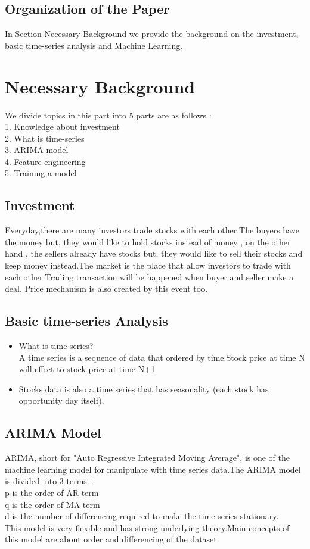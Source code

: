 \documentclass{article}
\begin{document}
\subsection{Organization of the Paper}

In Section Necessary Background we provide the background on the investment, basic time-series analysis and Machine Learning.



\section{Necessary Background}
\label{sec:background}


We divide topics in this part into 5 parts are as follows :\\
1. Knowledge about investment\\
2. What is time-series\\
3. ARIMA model\\
4. Feature engineering\\
5. Training a model


\subsection{Investment}
Everyday,there are many investors trade stocks with each other.The buyers have the money but, they would like to hold stocks instead of money , on the other hand , the sellers already have stocks but, they would like to sell their stocks and keep money instead.The market is the place that allow investors to trade with each other.Trading transaction will be happened when buyer and seller make a deal.
Price mechanism is also created by this event too.

\subsection{Basic time-series Analysis}
\begin{itemize}
\item What is time-series?\\A time series is a sequence of data that ordered by time.Stock price at time N will 
effect to stock price at time N+1
\item Stocks data is also a time series that has seasonality (each stock has opportunity day itself).
\end{itemize}


\subsection{ARIMA Model}
ARIMA, short for "Auto Regressive Integrated Moving Average", is one of the machine learning model for manipulate with time series data.The ARIMA model is divided into 3 terms :\\p is the order of AR term\\q is the order of MA term\\d is the number of differencing required to make the time series stationary.\\This model is very flexible and has strong underlying theory.Main concepts of this model are about order and differencing of the dataset. 
\end{document}
